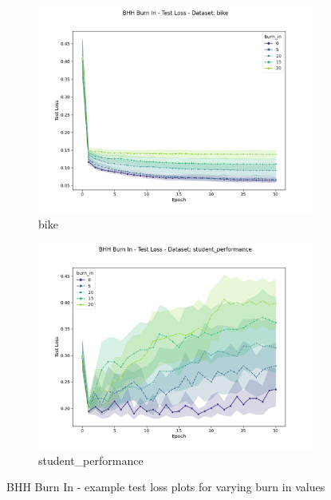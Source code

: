 \begin{figure}[htbp]
	\begin{subfigure}{0.5\textwidth}
    	\centering
        \includegraphics[width=\textwidth]{analysis/bhh_burn_in/figures/test/loss/bike.png}
        \caption{bike}
        \label{fig:results:burn_in:figures:loss1}
	\end{subfigure}
		\begin{subfigure}{0.5\textwidth}
    	\centering
        \includegraphics[width=\textwidth]{analysis/bhh_burn_in/figures/test/loss/student_performance.png}
        \caption{student\_performance}
        \label{fig:results:burn_in:figures:loss2}
	\end{subfigure}
	\caption{\Acs{BHH} Burn In - example test loss plots for varying burn in values}
	\label{fig:results:burn_in:figures:loss}
\end{figure}

